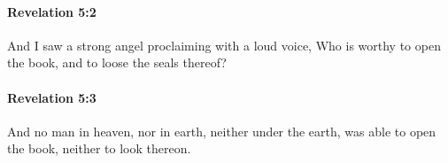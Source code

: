 		\paragraph{Revelation 5:2} %
			\label{REVELATIONNT-5-2}

			And I saw a strong angel proclaiming with a loud voice, Who is worthy to open the book, and to loose the seals thereof?

			\begin{framed}
			\scriptsize
				\begin{compactdesc}
					\item[SBLG] 
				\end{compactdesc}
			\end{framed}

		\paragraph{Revelation 5:3} %
			\label{REVELATIONNT-5-3}

			And no man in heaven, nor in earth, neither under the earth, was able to open the book, neither to look thereon.

